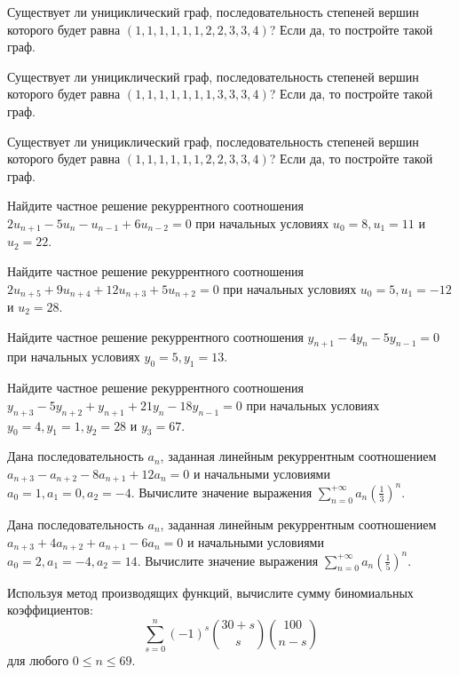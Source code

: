 Существует ли унициклический граф, последовательность степеней вершин которого будет равна  $(1,1,1,1,1,1,2,2,3,3,4)$? Если да, то постройте такой граф.

Существует ли унициклический граф, последовательность степеней вершин которого будет равна $(1,1,1,1,1,1,1,3,3,3,4)$? Если да, то постройте такой граф.

Существует ли унициклический граф, последовательность степеней вершин которого будет равна $(1,1,1,1,1,1,2,2,3,3,4)$? Если да, то постройте такой граф.

Найдите частное решение рекуррентного соотношения $2u_{n+1}-5u_{n}-u_{n-1}+6u_{n-2}=0$ при начальных условиях $u_0=8,u_1=11$ и $u_2=22$.

Найдите частное решение рекуррентного соотношения $2u_{n+5}+9u_{n+4}+12u_{n+3}+5u_{n+2}=0$ при начальных условиях $u_0=5,u_1=-12$ и $u_2=28$.

Найдите частное решение рекуррентного соотношения $y_{n+1}-4y_{n}-5y_{n-1}=0$ при начальных условиях $y_0=5, y_1=13.$

Найдите частное решение рекуррентного соотношения $y_{n+3}-5y_{n+2}+y_{n+1}+21y_{n}-18y_{n-1}=0$ при начальных условиях $y_0=4, y_1=1, y_2=28$ и $y_3=67.$

Дана последовательность $a_n$, заданная линейным рекуррентным соотношением $a_{n+3}-a_{n+2}-8a_{n+1}+12a_n=0$ и начальными условиями $a_0=1,a_1=0,a_2=-4$. Вычислите значение выражения $\sum_{n=0}^{+\infty}a_n\left(\frac{1}{3}\right)^n$.


Дана последовательность $a_n$, заданная линейным рекуррентным соотношением $a_{n+3}+4a_{n+2}+a_{n+1}-6a_n=0$ и начальными условиями $a_0=2,a_1=-4,a_2=14$. Вычислите значение выражения $\sum_{n=0}^{+\infty}a_n\left(\frac{1}{5}\right)^n$.


Используя метод производящих функций, вычислите сумму биномиальных коэффициентов:
\[\sum_{s=0}^n(-1)^s \binom{30+s}{s}\binom{100}{n-s}\]
для любого $0\leqslant n\leqslant 69.$


